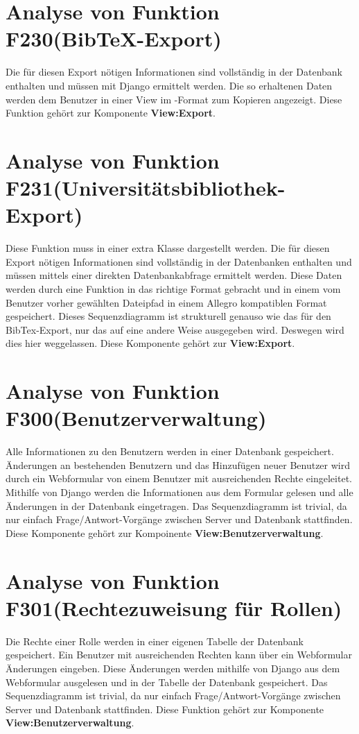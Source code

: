 \section{Analyse von Funktion F230(Bib\TeX -Export)}
Die für diesen Export nötigen Informationen sind vollständig in der Datenbank enthalten und müssen mit Django ermittelt werden. Die so erhaltenen Daten werden dem Benutzer in einer View im \BibTeX -Format zum Kopieren angezeigt. Diese Funktion gehört zur Komponente \textbf{View:Export}.


\section{Analyse von Funktion F231(Universitätsbibliothek-Export)}
Diese Funktion muss in einer extra Klasse dargestellt werden. Die für diesen Export nötigen Informationen sind vollständig in der Datenbanken enthalten und müssen mittels einer direkten Datenbankabfrage ermittelt werden. Diese Daten werden durch eine Funktion in das richtige Format gebracht und in einem vom Benutzer vorher gewählten Dateipfad in einem Allegro kompatiblen Format gespeichert. Dieses Sequenzdiagramm ist strukturell genauso wie das für den BibTex-Export, nur das auf eine andere Weise ausgegeben wird. Deswegen wird dies hier weggelassen. Diese Komponente gehört zur \textbf{View:Export}.

\section{Analyse von Funktion F300(Benutzerverwaltung)}
Alle Informationen zu den Benutzern werden in einer Datenbank gespeichert. Änderungen an bestehenden Benutzern und das Hinzufügen neuer Benutzer wird durch ein Webformular von einem Benutzer mit ausreichenden Rechte eingeleitet. Mithilfe von Django werden die Informationen aus dem Formular gelesen und alle Änderungen in der Datenbank eingetragen. Das Sequenzdiagramm ist trivial, da nur einfach Frage/Antwort-Vorgänge zwischen Server und Datenbank stattfinden. Diese Komponente gehört zur Kompoinente \textbf{View:Benutzerverwaltung}.

\section{Analyse von Funktion F301(Rechtezuweisung für Rollen)}
Die Rechte einer Rolle werden in einer eigenen Tabelle der Datenbank gespeichert. Ein Benutzer mit ausreichenden Rechten kann über ein Webformular Änderungen eingeben. Diese Änderungen werden mithilfe von Django aus dem Webformular ausgelesen und in der Tabelle der Datenbank gespeichert. Das Sequenzdiagramm ist trivial, da nur einfach Frage/Antwort-Vorgänge zwischen Server und Datenbank stattfinden. Diese Funktion gehört zur Komponente \textbf{View:Benutzerverwaltung}.

